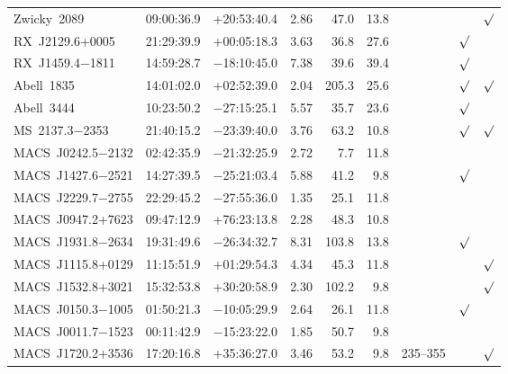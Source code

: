 \begin{table}
\begin{tabular}{lcccrrccc}
    Zwicky~2089          &  09:00:36.9  &  +20:53:40.4    &  2.86          &  47.0   &  13.8  &  ~          &         & $\surd$ \\
    RX~J2129.6+0005      &  21:29:39.9  &  +00:05:18.3    &  3.63          &  36.8   &  27.6  &  ~          & $\surd$ &         \\
    RX~J1459.4$-$1811    &  14:59:28.7  &  $-$18:10:45.0  &  7.38          &  39.6   &  39.4  &  ~          & $\surd$ &         \\
    Abell~1835           &  14:01:02.0  &  +02:52:39.0    &  2.04          &  205.3  &  25.6  &  ~          & $\surd$ & $\surd$ \\
    Abell~3444           &  10:23:50.2  &  $-$27:15:25.1  &  5.57          &  35.7   &  23.6  &  ~          & $\surd$ &         \\
    MS~2137.3$-$2353     &  21:40:15.2  &  $-$23:39:40.0  &  3.76          &  63.2   &  10.8  &  ~          & $\surd$ & $\surd$ \\
    MACS~J0242.5$-$2132  &  02:42:35.9  &  $-$21:32:25.9  &  2.72          &  7.7    &  11.8  &  ~          &         &         \\
    MACS~J1427.6$-$2521  &  14:27:39.5  &  $-$25:21:03.4  &  5.88          &  41.2   &  9.8   &  ~          & $\surd$ &         \\
    MACS~J2229.7$-$2755  &  22:29:45.2  &  $-$27:55:36.0  &  1.35          &  25.1   &  11.8  &  ~          &         &         \\
    MACS~J0947.2+7623    &  09:47:12.9  &  +76:23:13.8    &  2.28          &  48.3   &  10.8  &  ~          &         &         \\
    MACS~J1931.8$-$2634  &  19:31:49.6  &  $-$26:34:32.7  &  8.31          &  103.8  &  13.8  &  ~          & $\surd$ &         \\
    MACS~J1115.8+0129    &  11:15:51.9  &  +01:29:54.3    &  4.34          &  45.3   &  11.8  &  ~          &         & $\surd$ \\
    MACS~J1532.8+3021    &  15:32:53.8  &  +30:20:58.9    &  2.30          &  102.2  &  9.8   &  ~          &         & $\surd$ \\
    MACS~J0150.3$-$1005  &  01:50:21.3  &  $-$10:05:29.9  &  2.64          &  26.1   &  11.8  &  ~          & $\surd$ &         \\
    MACS~J0011.7$-$1523  &  00:11:42.9  &  $-$15:23:22.0  &  1.85          &  50.7   &  9.8   &  ~          &         &         \\
    MACS~J1720.2+3536    &  17:20:16.8  &  +35:36:27.0    &  3.46          &  53.2   &  9.8   &  235--355   &         & $\surd$ \\

\end{tabular}
\end{table}
